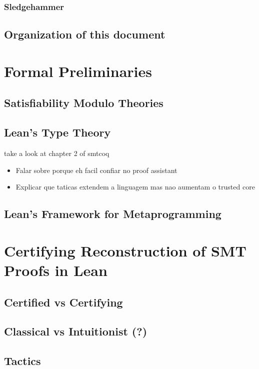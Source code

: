 \documentclass[
	msc,
	english
]{ppgccufmg}
\begin{document}
		\subsection{Sledgehammer}
           \label{sec:sledgehammer}
			
	  \section{Organization of this document}
	    
	\chapter{Formal Preliminaries}
	  \section{Satisfiability Modulo Theories}
	    
	  \section{Lean's Type Theory}
	    take a look at chapter 2 of smtcoq
	    \begin{itemize}
	      \item Falar sobre porque eh facil confiar no proof assistant
		  \item Explicar que taticas extendem a linguagem mas nao aumentam o trusted core
	    \end{itemize}
	  \section{Lean's Framework for Metaprogramming}
	\chapter{Certifying Reconstruction of SMT Proofs in Lean}
	  \section{Certified vs Certifying}
      \label{sec:certifiedVsCertifying}
	  \section{Classical vs Intuitionist (?)}
	  \section{Tactics}
\end{document}
